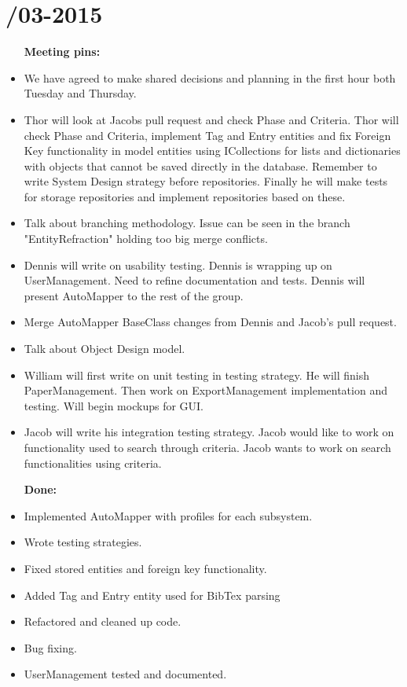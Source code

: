 \section{/03-2015} %
\attend{\at}{\at}{\at}{\at}


\begin{itemize}
	\item [\textbf{Meeting pins:}]
	\item We have agreed to make shared decisions and planning in the first hour both Tuesday and Thursday. 
	\item Thor will look at Jacobs pull request and check Phase and Criteria. Thor will check Phase and Criteria, implement Tag and Entry entities and fix Foreign Key functionality in model entities using ICollections for lists and dictionaries with objects that cannot be saved directly in the database. Remember to write System Design strategy before repositories. Finally he will make tests for storage repositories and implement repositories based on these. 
	\item Talk about branching methodology. Issue can be seen in the branch "EntityRefraction" holding too big merge conflicts.
	\item Dennis will write on usability testing. Dennis is wrapping up on UserManagement. Need to refine documentation and tests. Dennis will present AutoMapper to the rest of the group. 
	\item Merge AutoMapper BaseClass changes from Dennis and Jacob's pull request. 
	\item Talk about Object Design model. 
	\item William will first write on unit testing in testing strategy. He will finish PaperManagement. Then work on ExportManagement implementation and testing. Will begin mockups for GUI. 
	\item Jacob will write his integration testing strategy. Jacob would like to work on functionality used to search through criteria. Jacob wants to work on search functionalities using criteria. 
	\end{itemize}

\begin{itemize}
	\item [\textbf{Done:}]
	\item Implemented AutoMapper with profiles for each subsystem.
	\item Wrote testing strategies. 
	\item Fixed stored entities and foreign key functionality.
	\item Added Tag and Entry entity used for BibTex parsing
	\item Refactored and cleaned up code.
	\item Bug fixing. 
	\item UserManagement tested and documented. 
\end{itemize}

